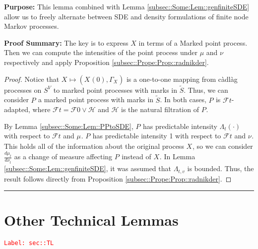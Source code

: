 \documentclass[12pt]{article}
\newcommand{\mc}{\mathcal}
\newcommand{\tr}{\textcolor{red}}
\newcommand{\labe}[1]{\tr{\texttt{Label: #1}}}
\newcommand{\purpose}{\textbf{Purpose: }}
\newcommand{\pfsum}{\textbf{Proof Summary: }}
\newcommand{\ind}{\hspace{24pt}}
\newcommand{\lin}{\rule{\linewidth}{0.4 pt}}
\renewcommand{\v}{v}							%
\renewcommand{\S}{S}							%
\renewcommand{\t}{t}							%
\newcommand{\F}{\mc{F}}							%
\newcommand{\FH}[2]{\mc{H}}						%
\newcommand{\V}{V}									%
\newcommand{\rxvt}[2]{X_{#1}{(#2)}}					%
\newcommand{\rxvts}[2]{X_{#1}{#2}}					%
\newcommand{\rp}[1]{P^{#1}}							%
\newcommand{\m}[3]{\mu_{#2#1}^{#3}}						%
\newcommand{\mm}[3]{\nu_{#2#1}^{#3}}						%
\newcommand{\ratee}[1]{\Lambda_{#1}}				%
\newcommand{\alt}{\widetilde}						%
\newcommand{\pmap}[1]{\Gamma_{#1}}				%
\begin{document}
\purpose This lemma combined with Lemma \ref{subsec::Some:Lem::genfiniteSDE} allow us to freely alternate between SDE and density formulations of finite node Markov processes.

\pfsum The key is to express \(X\) in terms of a Marked point process. Then we can compute the intensities of the point process under \(\mu\) and \(\nu\) respectively and apply Proposition \ref{subsec::Prope:Prop::radnikder}.

\begin{proof}
Notice that \(\rxvts{}{} \mapsto (\rxvt{}{0},\pmap{\rxvts{}{}})\) is a one-to-one mapping from c\`adl\`ag processes on \(\S^\V\) to marked point processes with marks in \(\alt{\S}\). Thus, we can consider \(\rp{}\) a marked point process with marks in \(\alt{\S}\). In both cases, \(\rp{}\) is \(\F{}{\t}\)-adapted, where \(\F{}{\t} = \F{}{0}\vee \FH{}{\t}\) and \(\FH{}{\t}\) is the natural filtration of \(\rp{}\).

\ind By Lemma \ref{subsec::Some:Lem::PPtoSDE}, \(\rp{}\) has predictable intensity \(\ratee{\t}(\cdot)\) with respect to \(\F{}{\t}\) and \(\m{}{}{}\). \(\rp{}\) has predictable intensity 1 with respect to \(\F{}{\t}\) and \(\mm{}{}{}\). This holds all of the information about the original process \(\rxvts{}{}\), so we can consider \(\frac{d\m{}{\t}{}}{d\mm{}{\t}{}}\) as a change of measure affecting \(\rp{}\) instead of \(\rxvts{}{}\). In Lemma \ref{subsec::Some:Lem::genfiniteSDE}, it was assumed that \(\ratee{\t,\v}\) is bounded. Thus, the result follows directly from Proposition \ref{subsec::Prope:Prop::radnikder}. 
\end{proof}

\lin
\section{Other Technical Lemmas}
\label{sec::TL}\labe{sec::TL}
\end{document}
